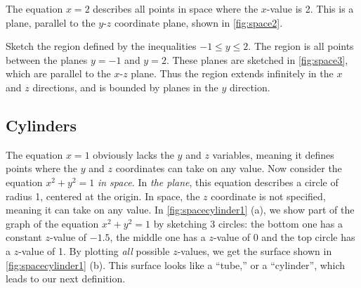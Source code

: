 
\begin{example}\label{ex_space_x_is_two}
The equation $x=2$ describes all points in space where the $x$-value is 2. This is a plane, parallel to the $y$-$z$ coordinate plane, shown in \autoref{fig:space2}.
\end{example}

\begin{example}\label{ex_space3}
Sketch the region defined by the inequalities $-1\leq y\leq 2$.
\solution
%
%
The region is all points between the planes $y=-1$ and $y=2$. These planes are sketched in \autoref{fig:space3}, which are parallel to the $x$-$z$ plane. Thus the region extends infinitely in the $x$ and $z$ directions, and is bounded by planes in the $y$ direction.
\end{example}

\subsection{Cylinders}

The equation $x=1$ obviously lacks the $y$ and $z$ variables, meaning it defines points where the $y$ and $z$ coordinates can take on any value. Now consider the equation $x^2+y^2=1$ \emph{in space.} In \emph{the plane}, this equation describes a circle of radius 1, centered at the origin. In space, the $z$ coordinate is not specified, meaning it can take on any value. In \autoref{fig:spacecylinder1} (a), we show part of the graph of the equation $x^2+y^2=1$ by sketching 3 circles: the bottom one has a constant $z$-value of $-1.5$, the middle one has a $z$-value of 0 and the top circle has a $z$-value of 1. By plotting \emph{all} possible $z$-values, we get the  surface shown in \autoref{fig:spacecylinder1} (b). This surface looks like a ``tube,'' or a ``cylinder'', which leads to our next definition.


